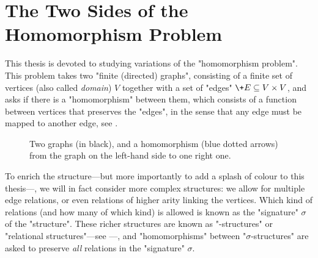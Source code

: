 \section{The Two Sides of the Homomorphism Problem}

This thesis is devoted to studying variations of the "homomorphism problem".
This problem takes two "finite (directed) graphs", consisting of a finite set of vertices (also called \emph{domain}) $V$ together with a set of
"edges" $\+E \subseteq V \times V$, and asks if there is a "homomorphism" 
between them, which consists of a function between vertices that preserves
the "edges", in the sense that any edge must be mapped to another edge,
see .

\begin{figure}
	\centering
	\caption{
		\AP\label{fig:example-graph-homomorphism}
		Two graphs (in black), and a homomorphism (blue dotted arrows) from the
		graph on the left-hand side to one right one.
	}
\end{figure}

To enrich the structure---but more importantly to add a splash of colour to this thesis---,
we will in fact consider more complex structures: 
we allow for multiple edge relations, or even relations of higher arity linking the vertices.
Which kind of relations (and how many of which kind) is allowed is known as the "signature" $\sigma$ of the "structure". 
These richer structures are known as "-structures" or "relational structures"---see
---, and
"homomorphisms" between "$\sigma$-structures" are asked to preserve \emph{all} relations
in the "signature" $\sigma$.

